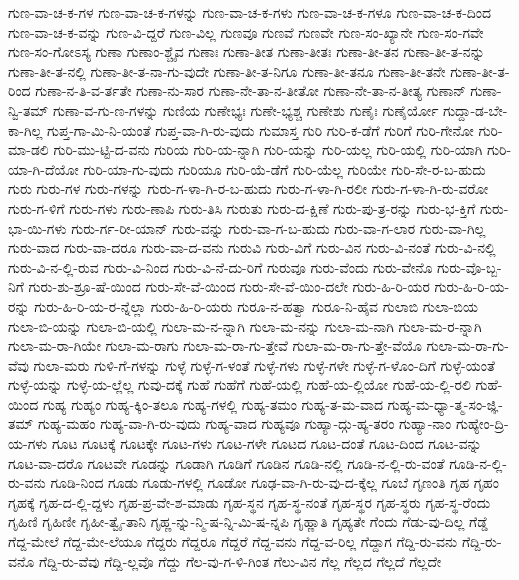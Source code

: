 {ಗುಣ-ವಾ-ಚ-ಕ-ಗಳ
ಗುಣ-ವಾ-ಚ-ಕ-ಗಳನ್ನು
ಗುಣ-ವಾ-ಚ-ಕ-ಗಳು
ಗುಣ-ವಾ-ಚ-ಕ-ಗಳೂ
ಗುಣ-ವಾ-ಚ-ಕ-ದಿಂದ
ಗುಣ-ವಾ-ಚ-ಕ-ವನ್ನು
ಗುಣ-ವಿ-ದ್ದರೆ
ಗುಣ-ವಿಲ್ಲ
ಗುಣವೂ
ಗುಣವೆ
ಗುಣವೇ
ಗುಣ-ಸಂ-ಖ್ಯಾನೇ
ಗುಣ-ಸಂ-ಗವೇ
ಗುಣ-ಸಂ-ಗೋಽಸ್ಯ
ಗುಣಾ
ಗುಣಾಂ-ಶ್ಚೈವ
ಗುಣಾಃ
ಗುಣಾ-ತೀತ
ಗುಣಾ-ತೀತಃ
ಗುಣಾ-ತೀ-ತನ
ಗುಣಾ-ತೀ-ತ-ನನ್ನು
ಗುಣಾ-ತೀ-ತ-ನಲ್ಲಿ
ಗುಣಾ-ತೀ-ತ-ನಾ-ಗು-ವುದೇ
ಗುಣಾ-ತೀ-ತ-ನಿಗೂ
ಗುಣಾ-ತೀ-ತನೂ
ಗುಣಾ-ತೀ-ತನೇ
ಗುಣಾ-ತೀ-ತ-ರಿಂದ
ಗುಣಾ-ನ-ತಿ-ವ-ರ್ತತೇ
ಗುಣಾ-ನು-ಸಾರ
ಗುಣಾ-ನೇ-ತಾ-ನ-ತೀತೋ
ಗುಣಾ-ನೇ-ತಾ-ನ-ತೀತ್ಯ
ಗುಣಾನ್
ಗುಣಾ-ನ್ವಿ-ತಮ್
ಗುಣಾ-ವ-ಗು-ಣ-ಗಳನ್ನು
ಗುಣಿಯ
ಗುಣೇಭ್ಯಃ
ಗುಣೇ-ಭ್ಯಶ್ಚ
ಗುಣೇಶು
ಗುಣೈಃ
ಗುಣೈರ್ಯೋ
ಗುದ್ದಾ-ಡ-ಬೇ-ಕಾ-ಗಿಲ್ಲ
ಗುಪ್ತ-ಗಾ-ಮಿ-ನಿ-ಯಂತೆ
ಗುಪ್ತ-ವಾ-ಗಿ-ರು-ವುದು
ಗುಮಾಸ್ತ
ಗುರಿ
ಗುರಿ-ಕ-ಡೆಗೆ
ಗುರಿಗೆ
ಗುರಿ-ಗೇನೋ
ಗುರಿ-ಮಾ-ಡಲಿ
ಗುರಿ-ಮು-ಟ್ಟಿ-ದ-ವನು
ಗುರಿಯ
ಗುರಿ-ಯ-ನ್ನಾಗಿ
ಗುರಿ-ಯನ್ನು
ಗುರಿ-ಯಲ್ಲ
ಗುರಿ-ಯಲ್ಲಿ
ಗುರಿ-ಯಾಗಿ
ಗುರಿ-ಯಾ-ಗಿ-ದೆಯೋ
ಗುರಿ-ಯಾ-ಗು-ವುದು
ಗುರಿಯೂ
ಗುರಿ-ಯೆ-ಡೆಗೆ
ಗುರಿ-ಯೆಲ್ಲ
ಗುರಿಯೇ
ಗುರಿ-ಸೇ-ರ-ಬ-ಹುದು
ಗುರು
ಗುರು-ಗಳ
ಗುರು-ಗಳನ್ನು
ಗುರು-ಗ-ಳಾ-ಗಿ-ರ-ಬ-ಹುದು
ಗುರು-ಗ-ಳಾ-ಗಿ-ರಲೀ
ಗುರು-ಗ-ಳಾ-ಗಿ-ರು-ವರೋ
ಗುರು-ಗ-ಳಿಗೆ
ಗುರು-ಗಳು
ಗುರು-ಣಾಪಿ
ಗುರು-ತಿಸಿ
ಗುರುತು
ಗುರು-ದ-ಕ್ಷಿಣೆ
ಗುರು-ಪು-ತ್ರ-ರನ್ನು
ಗುರು-ಭ-ಕ್ತಿಗೆ
ಗುರು-ಭಾ-ಯಿ-ಗಳು
ಗುರು-ರ್ಗ-ರೀ-ಯಾನ್
ಗುರು-ವನ್ನು
ಗುರು-ವಾ-ಗ-ಬ-ಹುದು
ಗುರು-ವಾ-ಗ-ಲಾರ
ಗುರು-ವಾ-ಗಿಲ್ಲ
ಗುರು-ವಾದ
ಗುರು-ವಾ-ದರೂ
ಗುರು-ವಾ-ದ-ವನು
ಗುರುವಿ
ಗುರು-ವಿಗೆ
ಗುರು-ವಿನ
ಗುರು-ವಿ-ನಂತೆ
ಗುರು-ವಿ-ನಲ್ಲಿ
ಗುರು-ವಿ-ನ-ಲ್ಲಿ-ರುವ
ಗುರು-ವಿ-ನಿಂದ
ಗುರು-ವಿ-ನೆ-ದು-ರಿಗೆ
ಗುರುವೂ
ಗುರು-ವೆಂದು
ಗುರು-ವೇನೊ
ಗುರು-ವೊ-ಬ್ಬ-ನಿಗೆ
ಗುರು-ಶು-ಶ್ರೂ-ಷೆ-ಯಿಂದ
ಗುರು-ಸೇ-ವೆ-ಯಿಂದ
ಗುರು-ಸೇ-ವೆ-ಯಿಂ-ದಲೇ
ಗುರು-ಹಿ-ರಿ-ಯರ
ಗುರು-ಹಿ-ರಿ-ಯ-ರನ್ನು
ಗುರು-ಹಿ-ರಿ-ಯ-ರ-ನ್ನೆಲ್ಲಾ
ಗುರು-ಹಿ-ರಿ-ಯರು
ಗುರೂ-ನ-ಹತ್ವಾ
ಗುರೂ-ನಿ-ಹೈವ
ಗುಲಾಬಿ
ಗುಲಾ-ಬಿಯ
ಗುಲಾ-ಬಿ-ಯನ್ನು
ಗುಲಾ-ಬಿ-ಯಲ್ಲಿ
ಗುಲಾ-ಮ-ನ-ನ್ನಾಗಿ
ಗುಲಾ-ಮ-ನನ್ನು
ಗುಲಾ-ಮ-ನಾಗಿ
ಗುಲಾ-ಮ-ರ-ನ್ನಾಗಿ
ಗುಲಾ-ಮ-ರಾ-ಗಿಯೇ
ಗುಲಾ-ಮ-ರಾಗು
ಗುಲಾ-ಮ-ರಾ-ಗು-ತ್ತೇವೆ
ಗುಲಾ-ಮ-ರಾ-ಗು-ತ್ತೇ-ವೆಯೊ
ಗುಲಾ-ಮ-ರಾ-ಗು-ವೆವು
ಗುಲಾ-ಮರು
ಗುಳಿ-ಗೆ-ಗಳನ್ನು
ಗುಳ್ಳೆ
ಗುಳ್ಳೆ-ಗ-ಳಂತೆ
ಗುಳ್ಳೆ-ಗಳು
ಗುಳ್ಳೆ-ಗಳೇ
ಗುಳ್ಳೆ-ಗ-ಳೊಂ-ದಿಗೆ
ಗುಳ್ಳೆ-ಯಂತೆ
ಗುಳ್ಳೆ-ಯನ್ನು
ಗುಳ್ಳೆ-ಯ-ಲ್ಲೆಲ್ಲ
ಗುವು-ದಕ್ಕೆ
ಗುಹೆ
ಗುಹೆಗೆ
ಗುಹೆ-ಯಲ್ಲಿ
ಗುಹೆ-ಯ-ಲ್ಲಿಯೋ
ಗುಹೆ-ಯ-ಲ್ಲಿ-ರಲಿ
ಗುಹೆ-ಯಿಂದ
ಗುಹ್ಯ
ಗುಹ್ಯಂ
ಗುಹ್ಯ-ಕ್ಕಿಂ-ತಲೂ
ಗುಹ್ಯ-ಗಳಲ್ಲಿ
ಗುಹ್ಯ-ತಮಂ
ಗುಹ್ಯ-ತ-ಮ-ವಾದ
ಗುಹ್ಯ-ಮ-ಧ್ಯಾ-ತ್ಮ-ಸಂ-ಜ್ಞಿ-ತಮ್
ಗುಹ್ಯ-ಮಹಂ
ಗುಹ್ಯ-ವಾ-ಗಿ-ರು-ವುದು
ಗುಹ್ಯ-ವಾದ
ಗುಹ್ಯವೂ
ಗುಹ್ಯಾ-ದ್ಗು-ಹ್ಯ-ತರಂ
ಗುಹ್ಯಾ-ನಾಂ
ಗುಹ್ಯೇಂ-ದ್ರಿ-ಯ-ಗಳು
ಗೂಟ
ಗೂಟಕ್ಕೆ
ಗೂಟಕ್ಕೇ
ಗೂಟ-ಗಳು
ಗೂಟ-ಗಳೇ
ಗೂಟದ
ಗೂಟ-ದಂತೆ
ಗೂಟ-ದಿಂದ
ಗೂಟ-ವನ್ನು
ಗೂಟ-ವಾ-ದರೊ
ಗೂಟವೇ
ಗೂಡನ್ನು
ಗೂಡಾಗಿ
ಗೂಡಿಗೆ
ಗೂಡಿನ
ಗೂಡಿ-ನಲ್ಲಿ
ಗೂಡಿ-ನ-ಲ್ಲಿ-ರು-ವಂತೆ
ಗೂಡಿ-ನ-ಲ್ಲಿ-ರು-ವನು
ಗೂಡಿ-ನಿಂದ
ಗೂಡು
ಗೂಡು-ಗಳಲ್ಲಿ
ಗೂಡೋ
ಗೂಢ-ವಾ-ಗಿ-ರು-ವು-ದ-ಕ್ಕೆಲ್ಲ
ಗೂಬೆ
ಗೃಣಂತಿ
ಗೃಹ
ಗೃಹಂ
ಗೃಹಕ್ಕೆ
ಗೃಹ-ದ-ಲ್ಲಿ-ದ್ದಳು
ಗೃಹ-ಪ್ರ-ವೇ-ಶ-ಮಾಡು
ಗೃಹ-ಸ್ಥನ
ಗೃಹ-ಸ್ಥ-ನಂತೆ
ಗೃಹ-ಸ್ಥರ
ಗೃಹ-ಸ್ಥರು
ಗೃಹ-ಸ್ಥ-ರೆಂದು
ಗೃಹಿಣಿ
ಗೃಹಿಣೀ
ಗೃಹೀ-ತ್ವೈ-ತಾನಿ
ಗೃಹ್ಣ-ನ್ನು-ನ್ಮಿ-ಷ-ನ್ನಿ-ಮಿ-ಷ-ನ್ನಪಿ
ಗೃಹ್ಣಾತಿ
ಗೃಹ್ಯತೇ
ಗೆಂದು
ಗೆಡು-ವು-ದಿಲ್ಲ
ಗೆಡ್ಡೆ
ಗೆದ್ದ-ಮೇಲೆ
ಗೆದ್ದ-ಮೇ-ಲೆಯೂ
ಗೆದ್ದರು
ಗೆದ್ದರೂ
ಗೆದ್ದರೆ
ಗೆದ್ದ-ವನು
ಗೆದ್ದ-ವ-ರಿಲ್ಲ
ಗೆದ್ದಾಗ
ಗೆದ್ದಿ-ರು-ವನು
ಗೆದ್ದಿ-ರು-ವನೊ
ಗೆದ್ದಿ-ರು-ವೆವು
ಗೆದ್ದಿ-ಲ್ಲವೊ
ಗೆದ್ದು
ಗೆಲ-ವು-ಗ-ಳಿ-ಗಿಂತ
ಗೆಲು-ವಿನ
ಗೆಲ್ಲ
ಗೆಲ್ಲದ
ಗೆಲ್ಲದೆ
ಗೆಲ್ಲದೇ
}
